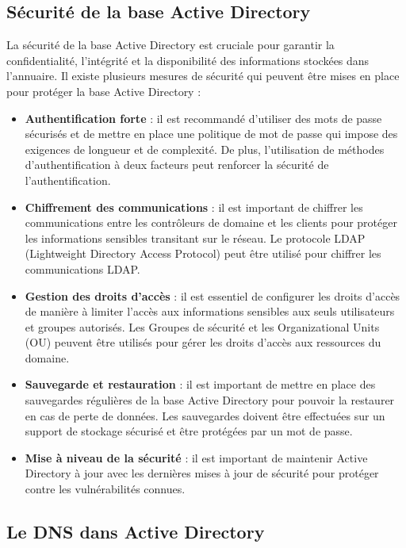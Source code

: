 \documentclass[12pt, a4paper]{article}
\begin{document}
\subsection{Sécurité de la base Active Directory}

La sécurité de la base Active Directory est cruciale pour garantir la 
confidentialité, l'intégrité et la disponibilité des informations stockées 
dans l'annuaire. Il existe plusieurs mesures de sécurité qui peuvent être 
mises en place pour protéger la base Active Directory :\\

\begin{itemize}
    \item \textbf{Authentification forte} : il est recommandé d'utiliser des mots de passe sécurisés et de mettre en place une politique de mot de passe qui impose des exigences de longueur et de complexité. De plus, l'utilisation de méthodes d'authentification à deux facteurs peut renforcer la sécurité de l'authentification.
    \item \textbf{Chiffrement des communications} : il est important de chiffrer les communications entre les contrôleurs de domaine et les clients pour protéger les informations sensibles transitant sur le réseau. Le protocole LDAP (Lightweight Directory Access Protocol) peut être utilisé pour chiffrer les communications LDAP.
    \item \textbf{Gestion des droits d'accès} : il est essentiel de configurer les droits d'accès de manière à limiter l'accès aux informations sensibles aux seuls utilisateurs et groupes autorisés. Les Groupes de sécurité et les Organizational Units (OU) peuvent être utilisés pour gérer les droits d'accès aux ressources du domaine.
    \item \textbf{Sauvegarde et restauration} : il est important de mettre en place des sauvegardes régulières de la base Active Directory pour pouvoir la restaurer en cas de perte de données. Les sauvegardes doivent être effectuées sur un support de stockage sécurisé et être protégées par un mot de passe.
    \item \textbf{Mise à niveau de la sécurité} : il est important de maintenir Active Directory à jour avec les dernières mises à jour de sécurité pour protéger contre les vulnérabilités connues.
\end{itemize}

\subsection{Le DNS dans Active Directory}
\end{document}

